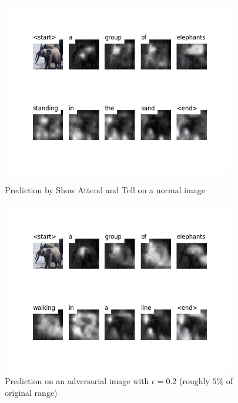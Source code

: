 \begin{figure}
    \centering
    \begin{minipage}{0.45\textwidth}
        \centering
        \includegraphics[width=0.9\textwidth]{figures/caption_elephant_normal.png} %
        \caption{Prediction by Show Attend and Tell on a normal image}
    \end{minipage}\hfill
    \begin{minipage}{0.45\textwidth}
        \centering
        \includegraphics[width=0.9\textwidth]{figures/caption_elephant_adversarial.png} %
        \caption{Prediction on an adversarial image with $\epsilon=0.2$ (roughly $5\%$ of original range)}
    \end{minipage}
\end{figure}